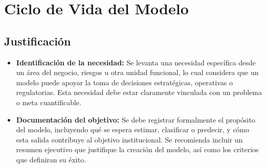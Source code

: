 \documentclass[11pt,oneside]{article}%
\begin{document}
\section{Ciclo de Vida del Modelo}

\subsection{Justificación}
\begin{itemize}
\item \textbf{Identificación de la necesidad:} Se levanta una necesidad específica desde un área del negocio, riesgos u otra unidad funcional, lo cual considera que un modelo puede apoyar la toma de decisiones estratégicas, operativas o regulatorias. Esta necesidad debe estar claramente vinculada con un problema o meta cuantificable. 
\item \textbf{Documentación del objetivo:} Se debe registrar formalmente el propósito del modelo, incluyendo qué se espera estimar, clasificar o predecir, y cómo esta salida contribuye al objetivo institucional. Se recomienda incluir un resumen ejecutivo que justifique la creación del modelo, así como los criterios que definiran su éxito. 
\end{itemize}

\end{document}
